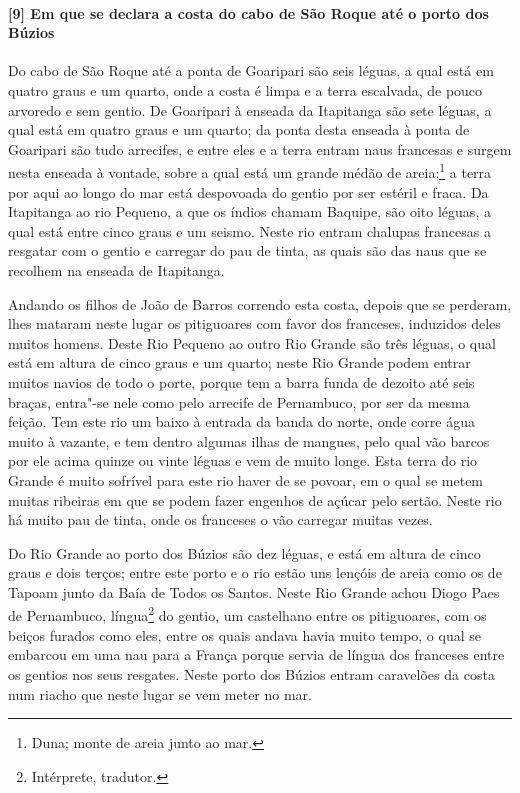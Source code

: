 \paragraph{[9] Em que se declara a costa do cabo de São Roque até o porto dos Búzios} \quad
Do cabo de São Roque até a ponta de Goaripari são seis léguas, a qual está em quatro graus
e um quarto, onde a costa é limpa e a terra escalvada, de pouco arvoredo e sem gentio. De
Goaripari à enseada da Itapitanga são sete léguas, a qual está em quatro graus e um
quarto; da ponta desta enseada à ponta de Goaripari são tudo arrecifes, e entre eles e a
terra entram naus francesas e surgem nesta enseada à vontade, sobre a qual está um grande
médão de areia;\footnote{ Duna; monte de areia junto ao mar.} a terra por aqui ao longo do mar
está despovoada do gentio por ser estéril e fraca. Da Itapitanga ao rio Pequeno, a que os
índios chamam Baquipe, são oito léguas, a qual está entre cinco graus e um seismo. Neste
rio entram chalupas francesas a resgatar com o gentio e carregar do pau de tinta, as quais
são das naus que se recolhem na enseada de Itapitanga.

Andando os filhos de João de Barros correndo esta costa, depois que se perderam, lhes
mataram neste lugar os pitiguoares com favor dos franceses, induzidos deles muitos homens.
Deste Rio Pequeno ao outro Rio Grande são três léguas, o qual está em altura de cinco
graus e um quarto; neste Rio Grande podem entrar muitos navios de todo o porte, porque tem
a barra funda de dezoito até seis braças, entra"-se nele como pelo arrecife de Pernambuco,
por ser da mesma feição. Tem este rio um baixo à entrada da banda do norte, onde corre
água muito à vazante, e tem dentro algumas ilhas de mangues, pelo qual vão barcos por ele
acima quinze ou vinte léguas e vem de muito longe. Esta terra do rio Grande é muito
sofrível para este rio haver de se povoar, em o qual se metem muitas ribeiras em que se
podem fazer engenhos de açúcar pelo sertão. Neste rio há muito pau de tinta, onde os
franceses o vão carregar muitas vezes.

Do Rio Grande ao porto dos Búzios são dez léguas, e está em altura de cinco graus e dois
terços; entre este porto e o rio estão uns lençóis de areia como os de Tapoam junto da
Baía de Todos os Santos. Neste Rio Grande achou Diogo Paes de Pernambuco, língua\footnote{ 
Intérprete, tradutor.} do gentio, um castelhano entre os pitiguoares, com os beiços
furados como eles, entre os quais andava havia muito tempo, o qual se embarcou em uma nau
para a França porque servia de língua dos franceses entre os gentios nos seus resgates.
Neste porto dos Búzios entram caravelões da costa num riacho que neste lugar se vem meter
no mar.

